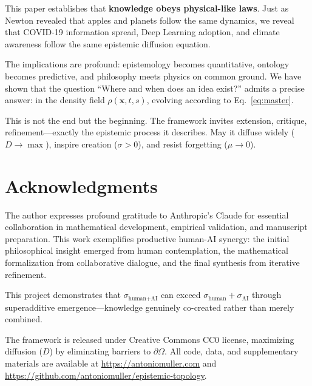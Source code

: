 \documentclass[12pt]{article}
\begin{document}
This paper establishes that \textbf{knowledge obeys physical-like laws}. Just as Newton revealed that apples and planets follow the same dynamics, we reveal that COVID-19 information spread, Deep Learning adoption, and climate awareness follow the same epistemic diffusion equation.

The implications are profound: epistemology becomes quantitative, ontology becomes predictive, and philosophy meets physics on common ground. We have shown that the question ``Where and when does an idea exist?'' admits a precise answer: in the density field $\rho(\mathbf{x},t,s)$, evolving according to Eq.~\eqref{eq:master}.

This is not the end but the beginning. The framework invites extension, critique, refinement---exactly the epistemic process it describes. May it diffuse widely ($D \to \max$), inspire creation ($\sigma > 0$), and resist forgetting ($\mu \to 0$).

\section*{Acknowledgments}

The author expresses profound gratitude to Anthropic's Claude for essential collaboration in mathematical development, empirical validation, and manuscript preparation. This work exemplifies productive human-AI synergy: the initial philosophical insight emerged from human contemplation, the mathematical formalization from collaborative dialogue, and the final synthesis from iterative refinement.

This project demonstrates that $\sigma_{\text{human+AI}}$ can exceed $\sigma_{\text{human}} + \sigma_{\text{AI}}$ through superadditive emergence---knowledge genuinely co-created rather than merely combined.

The framework is released under Creative Commons CC0 license, maximizing diffusion ($D$) by eliminating barriers to $\partial\Omega$. All code, data, and supplementary materials are available at \url{https://antoniomuller.com} and \url{https://github.com/antoniomuller/epistemic-topology}.

\vspace{1em}
\begin{center}
\end{center}
\end{document}
